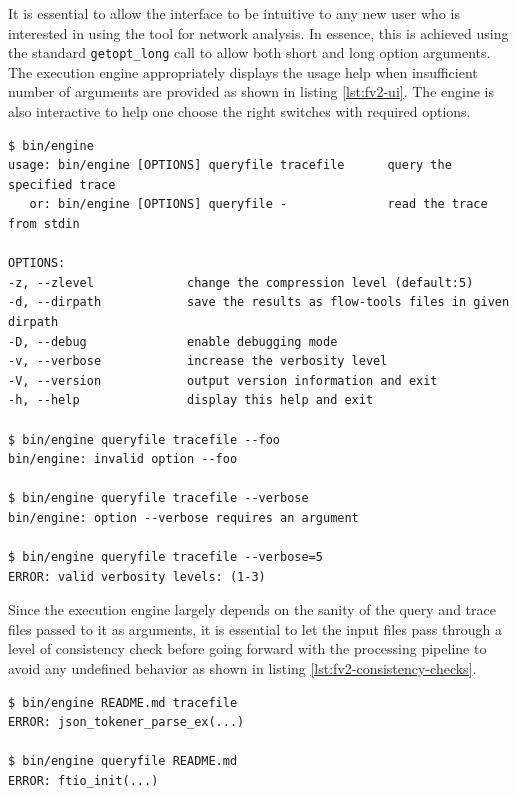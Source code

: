 It is essential to allow the interface to be intuitive to any new user who is
interested in using the tool for network analysis. In essence, this is
achieved  using the
standard \texttt{getopt\_long} call to allow both short and long option
arguments. The execution engine appropriately displays the usage help when
insufficient number of arguments are provided as shown in listing
\ref{lst:fv2-ui}.  The engine is also interactive to help one choose the right
switches with required options.

\begin{lstlisting}
$ bin/engine
usage: bin/engine [OPTIONS] queryfile tracefile      query the specified trace
   or: bin/engine [OPTIONS] queryfile -              read the trace from stdin

OPTIONS:
-z, --zlevel             change the compression level (default:5)
-d, --dirpath            save the results as flow-tools files in given dirpath
-D, --debug              enable debugging mode
-v, --verbose            increase the verbosity level
-V, --version            output version information and exit
-h, --help               display this help and exit

$ bin/engine queryfile tracefile --foo
bin/engine: invalid option --foo

$ bin/engine queryfile tracefile --verbose
bin/engine: option --verbose requires an argument

$ bin/engine queryfile tracefile --verbose=5
ERROR: valid verbosity levels: (1-3)
\end{lstlisting}

Since the execution engine largely depends on the sanity of the query and
trace files passed to it as arguments, it is essential to let the input files
pass  through a level of consistency check
before going forward with the processing pipeline to avoid any undefined
behavior as shown in listing \ref{lst:fv2-consistency-checks}.

\begin{lstlisting}
$ bin/engine README.md tracefile
ERROR: json_tokener_parse_ex(...)

$ bin/engine queryfile README.md
ERROR: ftio_init(...)
\end{lstlisting}

